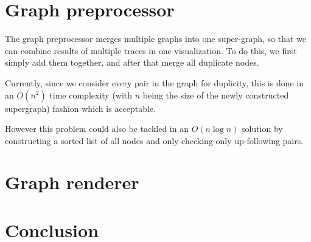 \documentclass[a4paper,10pt]{article}
\begin{document}
\section{Graph preprocessor}
The graph preprocessor merges multiple graphs into one super-graph, so that we can combine results of multiple traces in one visualization. To do this, we first simply add them together, and after that merge all duplicate nodes. 

Currently, since we consider every pair in the graph for duplicity, this is done in an $O(n^2)$ time complexity (with $n$ being the size of the newly constructed supergraph) fashion which is acceptable.

However this problem could also be tackled in an $O(n \log n)$ solution by constructing a sorted list of all nodes and only checking only up-following pairs.

\section{Graph renderer}


\section{Conclusion}
\end{document}
